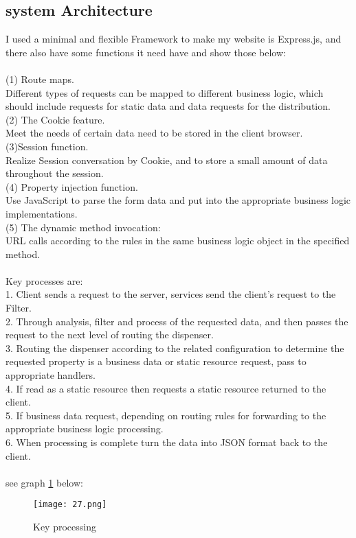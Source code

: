 \subsection{system Architecture} 
I used a minimal and flexible Framework to make my website is Express.js, and there also have some functions it need have and show those below:\\
\\
(1) Route maps.\\
Different types of requests can be mapped to different business logic, which should include requests for static data and data requests for the distribution.\\
(2) The Cookie feature.\\
 Meet the needs of certain data need to be stored in the client browser.\\
(3)Session function.\\
Realize Session conversation by Cookie, and to store a small amount of data throughout the session.\\
(4) Property injection function. \\
Use JavaScript to parse the form data and put into the appropriate business logic implementations.\\
(5) The dynamic method invocation:\\
 URL calls according to the rules in the same business logic object in the specified method.\\
\\
Key processes are:\\
1.	Client sends a request to the server, services send the client’s request to the Filter.\\ 
2.	Through analysis, filter and process of the requested data, and then passes the request to the next level of routing the dispenser.\\
3.	 Routing the dispenser according to the related configuration to determine the requested property is a business data or static resource request, pass to appropriate handlers.\\
4.	 If read as a static resource then requests a static resource returned to the client.\\ 
5.	If business data request, depending on routing rules for forwarding to the appropriate business logic processing.\\
6.	 When processing is complete turn the data into JSON format back to the client.\\
\\
see graph \ref{fig:2 cubed graph} below:
\begin{figure}[h]
	\centering
	\texttt{[image: 27.png]}
	\caption{Key processing}
	\label{fig:2 cubed graph}
\end{figure}
\\
